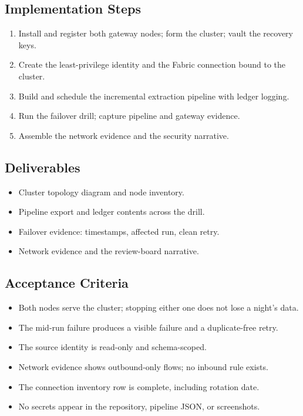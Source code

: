 \subsection*{Implementation Steps}
\begin{enumerate}
    \item Install and register both gateway nodes; form the cluster; vault the recovery keys.
    \item Create the least-privilege identity and the Fabric connection bound to the cluster.
    \item Build and schedule the incremental extraction pipeline with ledger logging.
    \item Run the failover drill; capture pipeline and gateway evidence.
    \item Assemble the network evidence and the security narrative.
\end{enumerate}

\subsection*{Deliverables}
\begin{itemize}
    \item Cluster topology diagram and node inventory.
    \item Pipeline export and ledger contents across the drill.
    \item Failover evidence: timestamps, affected run, clean retry.
    \item Network evidence and the review-board narrative.
\end{itemize}

\subsection*{Acceptance Criteria}
\begin{itemize}
    \item[\(\square\)] Both nodes serve the cluster; stopping either one does not lose a night's data.
    \item[\(\square\)] The mid-run failure produces a visible failure and a duplicate-free retry.
    \item[\(\square\)] The source identity is read-only and schema-scoped.
    \item[\(\square\)] Network evidence shows outbound-only flows; no inbound rule exists.
    \item[\(\square\)] The connection inventory row is complete, including rotation date.
    \item[\(\square\)] No secrets appear in the repository, pipeline JSON, or screenshots.
\end{itemize}

